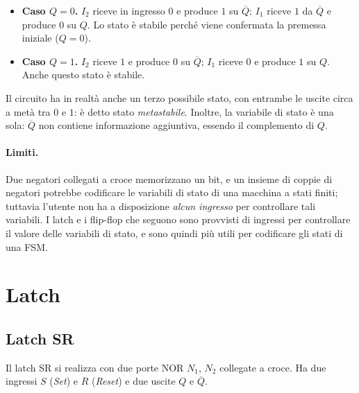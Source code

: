\documentclass[11pt,a4paper]{article}
\begin{document}
\begin{itemize}
  \item \textbf{Caso $Q = 0$.} $I_2$ riceve in ingresso $0$ e produce $1$ su $\overline{Q}$; $I_1$ riceve $1$ da $\overline{Q}$ e produce $0$ su $Q$. Lo stato è stabile perché viene confermata la premessa iniziale ($Q = 0$).
  \item \textbf{Caso $Q = 1$.} $I_2$ riceve $1$ e produce $0$ su $\overline{Q}$; $I_1$ riceve $0$ e produce $1$ su $Q$. Anche questo stato è stabile.
\end{itemize}

\begin{osservazione}
Il circuito ha in realtà anche un terzo possibile stato, con entrambe le uscite circa a metà tra $0$ e $1$: è detto stato \emph{metastabile}. Inoltre, la variabile di stato è una sola: $\overline{Q}$ non contiene informazione aggiuntiva, essendo il complemento di $Q$.
\end{osservazione}

\paragraph{Limiti.} Due negatori collegati a croce memorizzano un bit, e un insieme di coppie di negatori potrebbe codificare le variabili di stato di una macchina a stati finiti; tuttavia l'utente non ha a disposizione \emph{alcun ingresso} per controllare tali variabili. I latch e i flip-flop che seguono sono provvisti di ingressi per controllare il valore delle variabili di stato, e sono quindi più utili per codificare gli stati di una FSM.

\section{Latch}

\subsection{Latch SR}

Il latch SR si realizza con due porte NOR $N_1$, $N_2$ collegate a croce. Ha due ingressi $S$ (\emph{Set}) e $R$ (\emph{Reset}) e due uscite $Q$ e $\overline{Q}$.

\begin{center}
\end{center}
\end{document}
